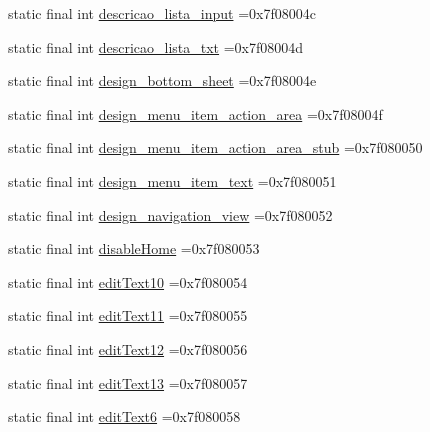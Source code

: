 \begin{DoxyCompactItemize}
static final int \mbox{\hyperlink{classbr_1_1unb_1_1cic_1_1mp_1_1marketmaster_1_1R_1_1id_a48327d04c57334f7c256804fbd19c7b1}{descricao\+\_\+lista\+\_\+input}} =0x7f08004c
\item 
static final int \mbox{\hyperlink{classbr_1_1unb_1_1cic_1_1mp_1_1marketmaster_1_1R_1_1id_a62706aba49b8662e33c46972c6d6d00c}{descricao\+\_\+lista\+\_\+txt}} =0x7f08004d
\item 
static final int \mbox{\hyperlink{classbr_1_1unb_1_1cic_1_1mp_1_1marketmaster_1_1R_1_1id_a302b5e41a169396d78d3fdf127327346}{design\+\_\+bottom\+\_\+sheet}} =0x7f08004e
\item 
static final int \mbox{\hyperlink{classbr_1_1unb_1_1cic_1_1mp_1_1marketmaster_1_1R_1_1id_abf7cd4dda3dcb9cc75c3fd0868e46376}{design\+\_\+menu\+\_\+item\+\_\+action\+\_\+area}} =0x7f08004f
\item 
static final int \mbox{\hyperlink{classbr_1_1unb_1_1cic_1_1mp_1_1marketmaster_1_1R_1_1id_a7670a45fbfabaab9a3d91f0f1ed30370}{design\+\_\+menu\+\_\+item\+\_\+action\+\_\+area\+\_\+stub}} =0x7f080050
\item 
static final int \mbox{\hyperlink{classbr_1_1unb_1_1cic_1_1mp_1_1marketmaster_1_1R_1_1id_a29a10bed04c99bd02b6df10894956852}{design\+\_\+menu\+\_\+item\+\_\+text}} =0x7f080051
\item 
static final int \mbox{\hyperlink{classbr_1_1unb_1_1cic_1_1mp_1_1marketmaster_1_1R_1_1id_adc6d105a02863985c06408f5da9b5eec}{design\+\_\+navigation\+\_\+view}} =0x7f080052
\item 
static final int \mbox{\hyperlink{classbr_1_1unb_1_1cic_1_1mp_1_1marketmaster_1_1R_1_1id_abf45084a5c4f4f54f2a21de15ecf4c59}{disable\+Home}} =0x7f080053
\item 
static final int \mbox{\hyperlink{classbr_1_1unb_1_1cic_1_1mp_1_1marketmaster_1_1R_1_1id_a65333e3586fd099bbba1904390dc5646}{edit\+Text10}} =0x7f080054
\item 
static final int \mbox{\hyperlink{classbr_1_1unb_1_1cic_1_1mp_1_1marketmaster_1_1R_1_1id_a10af1e9f384a93820bda92d0327f4e0a}{edit\+Text11}} =0x7f080055
\item 
static final int \mbox{\hyperlink{classbr_1_1unb_1_1cic_1_1mp_1_1marketmaster_1_1R_1_1id_a9cf81ecea817eb2711e8b58b97e2d4e5}{edit\+Text12}} =0x7f080056
\item 
static final int \mbox{\hyperlink{classbr_1_1unb_1_1cic_1_1mp_1_1marketmaster_1_1R_1_1id_ac379fd2b7a9f5f602fe6b2be3be143e1}{edit\+Text13}} =0x7f080057
\item 
static final int \mbox{\hyperlink{classbr_1_1unb_1_1cic_1_1mp_1_1marketmaster_1_1R_1_1id_acd0d281c57c942fef10c4f2fa86fae65}{edit\+Text6}} =0x7f080058

\end{DoxyCompactItemize}

